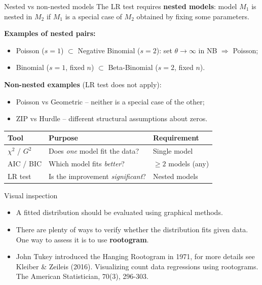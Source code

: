 \documentclass[10pt,ignorenonframetext,aspectratio=169]{beamer}
\begin{document}
\begin{frame}{Nested vs non-nested models}
    The LR test requires \textbf{nested models}: model $M_1$ is nested in $M_2$ if $M_1$ is a special case of $M_2$ obtained by fixing some parameters.

    \vspace{0.3cm}
    \textbf{Examples of nested pairs:}
    \begin{itemize}
        \item Poisson ($s=1$) $\subset$ Negative Binomial ($s=2$): set $\theta \to \infty$ in NB $\Rightarrow$ Poisson;
        \item Binomial ($s=1$, fixed $n$) $\subset$ Beta-Binomial ($s=2$, fixed $n$).
    \end{itemize}

    \vspace{0.3cm}
    \textbf{Non-nested examples} (LR test does not apply):
    \begin{itemize}
        \item Poisson vs Geometric -- neither is a special case of the other;
        \item ZIP vs Hurdle -- different structural assumptions about zeros.
    \end{itemize}

    \vspace{0.3cm}
    \begin{table}[]
        \centering
        \small
        \begin{tabular}{lll}
        \hline
        \textbf{Tool} & \textbf{Purpose} & \textbf{Requirement} \\
        \hline
        $\chi^2$ / $G^2$ & Does \textit{one} model fit the data? & Single model \\
        AIC / BIC & Which model fits \textit{better}? & $\geq 2$ models (any) \\
        LR test & Is the improvement \textit{significant}? & Nested models \\
        \hline
        \end{tabular}
    \end{table}
\end{frame}

\begin{frame}{Visual inspection}
\begin{itemize}
    \item A fitted distribution should be evaluated using graphical methods.
    \item There are plenty of ways to verify whether the distribution fits given data. One way to assess it is to use \textbf{rootogram}.
    \item John Tukey introduced the Hanging Rootogram in 1971, for more details see Kleiber \& Zeileis (2016). Visualizing count data regressions using rootograms. The American Statistician, 70(3), 296-303.
\end{itemize}
\end{frame}
\end{document}
